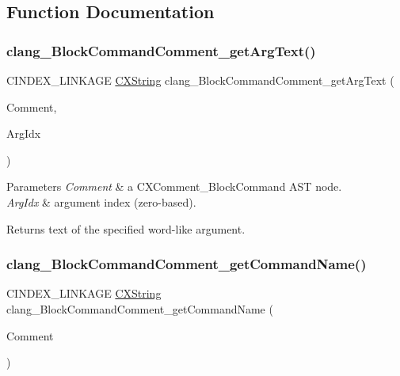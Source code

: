 \subsection{Function Documentation}
\mbox{\label{group__CINDEX__COMMENT_ga9faf08601d88c809a9a97a9826051990}} 
\subsubsection{\texorpdfstring{clang\+\_\+\+Block\+Command\+Comment\+\_\+get\+Arg\+Text()}{clang\_BlockCommandComment\_getArgText()}}
{\footnotesize\ttfamily C\+I\+N\+D\+E\+X\+\_\+\+L\+I\+N\+K\+A\+GE \hyperlink{structCXString}{C\+X\+String} clang\+\_\+\+Block\+Command\+Comment\+\_\+get\+Arg\+Text (\begin{DoxyParamCaption}\item[{\hyperlink{structCXComment}{C\+X\+Comment}}]{Comment,  }\item[{unsigned}]{Arg\+Idx }\end{DoxyParamCaption})}


\begin{DoxyParams}{Parameters}
{\em Comment} & a {\ttfamily C\+X\+Comment\+\_\+\+Block\+Command} A\+ST node.\\
\hline
{\em Arg\+Idx} & argument index (zero-\/based).\\
\hline
\end{DoxyParams}
\begin{DoxyReturn}{Returns}
text of the specified word-\/like argument. 
\end{DoxyReturn}
\mbox{\label{group__CINDEX__COMMENT_ga8fdde998537370477362a4f84bc03420}} 
\subsubsection{\texorpdfstring{clang\+\_\+\+Block\+Command\+Comment\+\_\+get\+Command\+Name()}{clang\_BlockCommandComment\_getCommandName()}}
{\footnotesize\ttfamily C\+I\+N\+D\+E\+X\+\_\+\+L\+I\+N\+K\+A\+GE \hyperlink{structCXString}{C\+X\+String} clang\+\_\+\+Block\+Command\+Comment\+\_\+get\+Command\+Name (\begin{DoxyParamCaption}\item[{\hyperlink{structCXComment}{C\+X\+Comment}}]{Comment }\end{DoxyParamCaption})}


